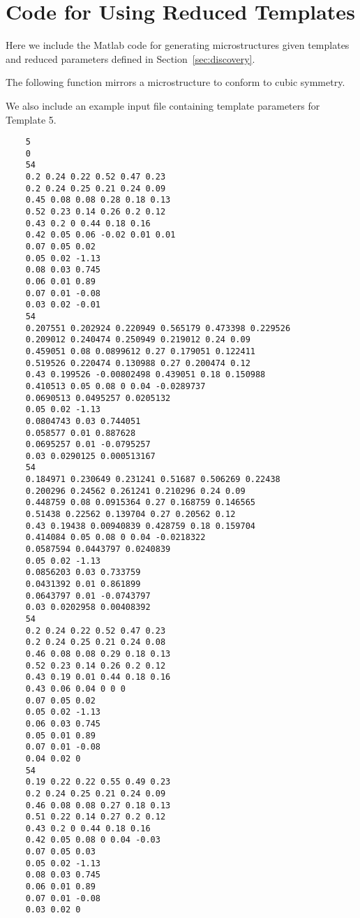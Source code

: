 \chapter{Code for Using Reduced Templates}
Here we include the Matlab code for generating microstructures given templates and reduced parameters defined in Section~\ref{sec:discovery}.

The following function mirrors a microstructure to conform to cubic symmetry.

We also include an example input file containing template parameters for Template 5.
\begin{verbatim}
	5
	0
	54
	0.2 0.24 0.22 0.52 0.47 0.23 
	0.2 0.24 0.25 0.21 0.24 0.09 
	0.45 0.08 0.08 0.28 0.18 0.13 
	0.52 0.23 0.14 0.26 0.2 0.12 
	0.43 0.2 0 0.44 0.18 0.16 
	0.42 0.05 0.06 -0.02 0.01 0.01 
	0.07 0.05 0.02 
	0.05 0.02 -1.13 
	0.08 0.03 0.745 
	0.06 0.01 0.89 
	0.07 0.01 -0.08 
	0.03 0.02 -0.01
	54
	0.207551 0.202924 0.220949 0.565179 0.473398 0.229526 
	0.209012 0.240474 0.250949 0.219012 0.24 0.09 
	0.459051 0.08 0.0899612 0.27 0.179051 0.122411 
	0.519526 0.220474 0.130988 0.27 0.200474 0.12 
	0.43 0.199526 -0.00802498 0.439051 0.18 0.150988 
	0.410513 0.05 0.08 0 0.04 -0.0289737 
	0.0690513 0.0495257 0.0205132 
	0.05 0.02 -1.13 
	0.0804743 0.03 0.744051 
	0.058577 0.01 0.887628 
	0.0695257 0.01 -0.0795257 
	0.03 0.0290125 0.000513167 
	54
	0.184971 0.230649 0.231241 0.51687 0.506269 0.22438 
	0.200296 0.24562 0.261241 0.210296 0.24 0.09 
	0.448759 0.08 0.0915364 0.27 0.168759 0.146565 
	0.51438 0.22562 0.139704 0.27 0.20562 0.12 
	0.43 0.19438 0.00940839 0.428759 0.18 0.159704 
	0.414084 0.05 0.08 0 0.04 -0.0218322 
	0.0587594 0.0443797 0.0240839 
	0.05 0.02 -1.13 
	0.0856203 0.03 0.733759 
	0.0431392 0.01 0.861899 
	0.0643797 0.01 -0.0743797 
	0.03 0.0202958 0.00408392 
	54
	0.2 0.24 0.22 0.52 0.47 0.23 
	0.2 0.24 0.25 0.21 0.24 0.08 
	0.46 0.08 0.08 0.29 0.18 0.13 
	0.52 0.23 0.14 0.26 0.2 0.12 
	0.43 0.19 0.01 0.44 0.18 0.16 
	0.43 0.06 0.04 0 0 0 
	0.07 0.05 0.02 
	0.05 0.02 -1.13 
	0.06 0.03 0.745 
	0.05 0.01 0.89 
	0.07 0.01 -0.08 
	0.04 0.02 0
	54
	0.19 0.22 0.22 0.55 0.49 0.23 
	0.2 0.24 0.25 0.21 0.24 0.09 
	0.46 0.08 0.08 0.27 0.18 0.13 
	0.51 0.22 0.14 0.27 0.2 0.12 
	0.43 0.2 0 0.44 0.18 0.16 
	0.42 0.05 0.08 0 0.04 -0.03
	0.07 0.05 0.03 
	0.05 0.02 -1.13 
	0.08 0.03 0.745 
	0.06 0.01 0.89 
	0.07 0.01 -0.08 
	0.03 0.02 0	
\end{verbatim}